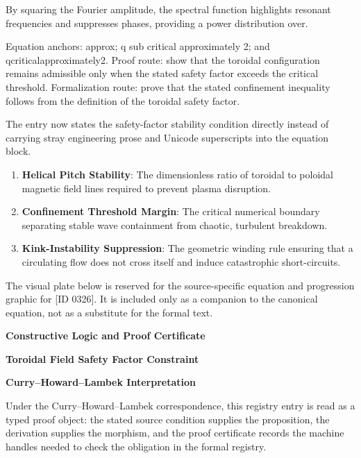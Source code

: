 By squaring the Fourier amplitude, the spectral function highlights resonant frequencies and suppresses phases, providing a power distribution over.

Equation anchors: approx; q sub critical approximately 2; and qcriticalapproximately2. Proof route: show that the toroidal configuration remains admissible only when the stated safety factor exceeds the critical threshold. Formalization route: prove that the stated confinement inequality follows from the definition of the toroidal safety factor.

The entry now states the safety-factor stability condition directly instead of carrying stray engineering prose and Unicode superscripts into the equation block.
\endgroup

\begin{enumerate}[leftmargin=1.6em,itemsep=6pt,topsep=4pt]
\item \textbf{Helical Pitch Stability}: The dimensionless ratio of toroidal to poloidal magnetic field lines required to prevent plasma disruption.
\item \textbf{Confinement Threshold Margin}: The critical numerical boundary separating stable wave containment from chaotic, turbulent breakdown.
\item \textbf{Kink-Instability Suppression}: The geometric winding rule ensuring that a circulating flow does not cross itself and induce catastrophic short-circuits.
\end{enumerate}

\begingroup\footnotesize\sloppy
The visual plate below is reserved for the source-specific equation and progression graphic for [ID 0326]. It is included only as a companion to the canonical equation, not as a substitute for the formal text.
\par\endgroup
\ifTZPDarkEdition
{}
\fi

\clearpage
\begingroup\tzpsupportsetup
\noindent\textbf{\fontsize{10.8pt}{12.8pt}\selectfont [ID 0326] Constructive Logic and Proof Certificate}\par
\noindent\textbf{\fontsize{10pt}{12pt}\selectfont Toroidal Field Safety Factor Constraint}\par
\vspace{0.45em}
\begingroup
\footnotesize
\setlength{\parskip}{0.22em}
\setlength{\parindent}{0pt}
\noindent\textbf{Curry--Howard--Lambek Interpretation}\par
Under the Curry--Howard--Lambek correspondence, this registry entry is read as a typed proof
object: the stated source condition supplies the proposition, the derivation supplies the
morphism, and the proof certificate records the machine handles needed to check the obligation
in the formal registry.

